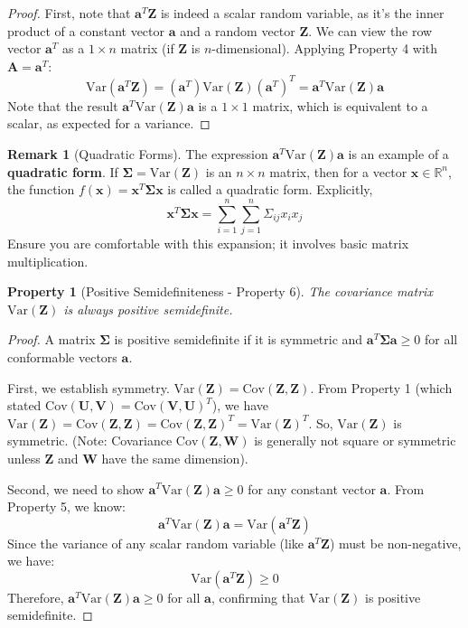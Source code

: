 \documentclass[11pt, letterpaper]{article}
\newtheorem{property}[theorem]{Property}
\theoremstyle{definition}
\newtheorem{remark}[theorem]{Remark}
\newcommand{\Var}{\text{Var}}
\newcommand{\Cov}{\text{Cov}}
\newcommand{\R}{\mathbb{R}}
\newcommand{\mat}[1]{\mathbf{#1}} %
\newcommand{\vect}[1]{\boldsymbol{#1}} %
\newcommand{\T}{^T} %
\begin{document}
\begin{proof}
First, note that $\vect{a}\T\vect{Z}$ is indeed a scalar random variable, as it's the inner product of a constant vector $\vect{a}$ and a random vector $\vect{Z}$.
We can view the row vector $\vect{a}\T$ as a $1 \times n$ matrix (if $\vect{Z}$ is $n$-dimensional). Applying Property 4 with $\mat{A} = \vect{a}\T$:
\[
\Var(\vect{a}\T\vect{Z}) = (\vect{a}\T) \Var(\vect{Z}) (\vect{a}\T)\T = \vect{a}\T \Var(\vect{Z}) \vect{a}
\]
Note that the result $\vect{a}\T \Var(\vect{Z}) \vect{a}$ is a $1 \times 1$ matrix, which is equivalent to a scalar, as expected for a variance.
\end{proof}

\begin{remark}[Quadratic Forms]
The expression $\vect{a}\T \Var(\vect{Z}) \vect{a}$ is an example of a \textbf{quadratic form}. If $\mat{\Sigma} = \Var(\vect{Z})$ is an $n \times n$ matrix, then for a vector $\vect{x} \in \R^n$, the function $f(\vect{x}) = \vect{x}\T \mat{\Sigma} \vect{x}$ is called a quadratic form. Explicitly,
\[
\vect{x}\T \mat{\Sigma} \vect{x} = \sum_{i=1}^n \sum_{j=1}^n \Sigma_{ij} x_i x_j
\]
Ensure you are comfortable with this expansion; it involves basic matrix multiplication.
\end{remark}

\begin{property}[Positive Semidefiniteness - Property 6]
The covariance matrix $\Var(\vect{Z})$ is always positive semidefinite.
\end{property}

\begin{proof}
A matrix $\mat{\Sigma}$ is positive semidefinite if it is symmetric and $\vect{a}\T \mat{\Sigma} \vect{a} \ge 0$ for all conformable vectors $\vect{a}$.

First, we establish symmetry. $\Var(\vect{Z}) = \Cov(\vect{Z}, \vect{Z})$. From Property 1 (which stated $\Cov(\vect{U}, \vect{V}) = \Cov(\vect{V}, \vect{U})\T$), we have $\Var(\vect{Z}) = \Cov(\vect{Z}, \vect{Z}) = \Cov(\vect{Z}, \vect{Z})\T = \Var(\vect{Z})\T$. So, $\Var(\vect{Z})$ is symmetric. (Note: Covariance $\Cov(\vect{Z}, \vect{W})$ is generally not square or symmetric unless $\vect{Z}$ and $\vect{W}$ have the same dimension).

Second, we need to show $\vect{a}\T \Var(\vect{Z}) \vect{a} \ge 0$ for any constant vector $\vect{a}$. From Property 5, we know:
\[
\vect{a}\T \Var(\vect{Z}) \vect{a} = \Var(\vect{a}\T\vect{Z})
\]
Since the variance of any scalar random variable (like $\vect{a}\T\vect{Z}$) must be non-negative, we have:
\[
\Var(\vect{a}\T\vect{Z}) \ge 0
\]
Therefore, $\vect{a}\T \Var(\vect{Z}) \vect{a} \ge 0$ for all $\vect{a}$, confirming that $\Var(\vect{Z})$ is positive semidefinite.
\end{proof}
\end{document}
